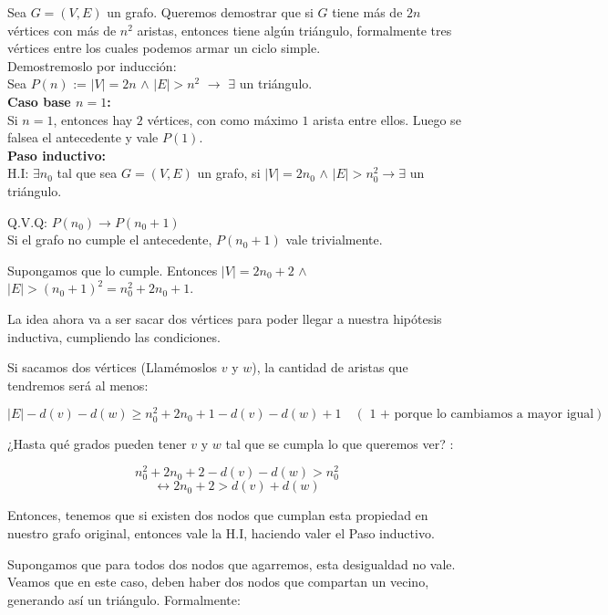 \documentclass{article}
\begin{document}
Sea $G = (V,E)$ un grafo. Queremos demostrar que si $G$ tiene más de $2n$ vértices con más de $n^2$ aristas, entonces tiene algún triángulo, formalmente tres vértices entre los cuales podemos armar un ciclo simple.\\

Demostremoslo por inducción:\\

Sea $P(n)$ := $|V| = 2n$ $\land$ $|E| > n^2$ $\rightarrow$ $\exists$ un triángulo.\\

\textbf{Caso base $n = 1$:} \\

Si $n = 1$, entonces hay $2$ vértices, con como máximo $1$ arista entre ellos. Luego se falsea el antecedente y vale $P(1)$.\\

\textbf{Paso inductivo:}\\

H.I: $\exists n_0$ tal que sea $G = (V,E)$ un grafo, si $|V| = 2n_0$ $\land$ $|E| > n_0^2 \rightarrow \exists$ un triángulo.

Q.V.Q: $P(n_0) \rightarrow P(n_0 + 1)$ \\

Si el grafo no cumple el antecedente, $P(n_0 + 1)$ vale trivialmente.

Supongamos que lo cumple. Entonces $|V| = 2n_0 + 2$ $\land$ $|E| > (n_0 + 1)^2 = n_0^2 + 2n_0 + 1$.

La idea ahora va a ser sacar dos vértices para poder llegar a nuestra hipótesis inductiva, cumpliendo las condiciones.

Si sacamos dos vértices (Llamémoslos $v$ y $w$), la cantidad de aristas que tendremos será al menos: 

\[
|E| - d(v) - d(w) \geq n_0^2 + 2n_0 + 1  - d(v) - d(w) + 1 \quad (\text{ 1 + porque lo cambiamos a mayor igual})
\]

¿Hasta qué grados pueden tener $v$ y $w$ tal que se cumpla lo que queremos ver? :

\[
n_0^2 + 2n_0 + 2 - d(v) - d(w) > n_0^2   
\]
\[
 \leftrightarrow  2n_0 + 2 > d(v) + d(w)
\]

Entonces, tenemos que si existen dos nodos que cumplan esta propiedad en nuestro grafo original, entonces vale la H.I, haciendo valer el Paso inductivo.

Supongamos que para todos dos nodos que agarremos, esta desigualdad no vale. Veamos que en este caso, deben haber dos nodos que compartan un vecino, generando así un triángulo. Formalmente:\\
\end{document}

